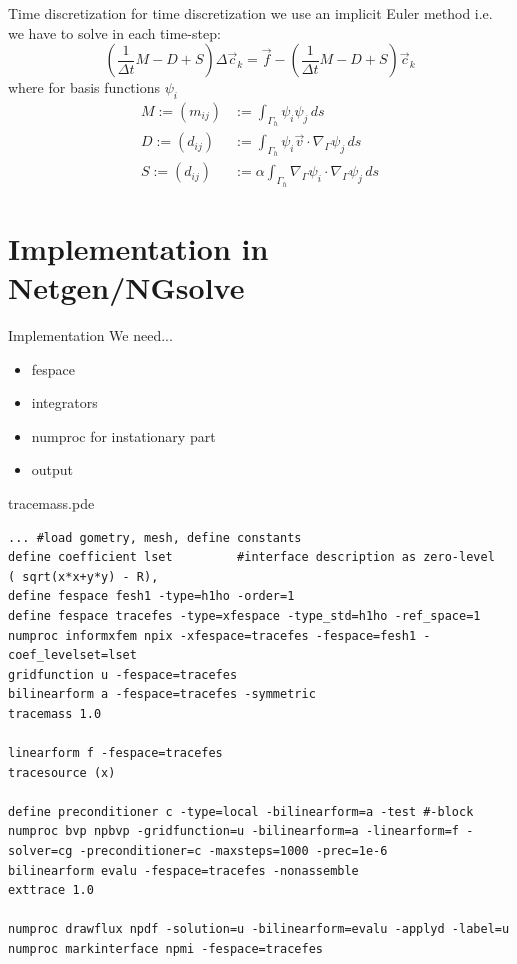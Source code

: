 \documentclass[11pt]{beamer}
\theoremstyle{plain}
\theoremstyle{definition}
\theoremstyle{remark}
\newcommand{\boundary}{\Gamma}
\begin{document}
\begin{frame}{Time discretization}
	for time discretization we use an implicit Euler method i.e. we have to solve in each time-step:
	\begin{equation}
		\left(\frac{1}{\Delta t}M-D+S\right)\Delta\vec c_{k}=\vec f-\left(\frac{1}{\Delta t}M-D+S\right)\vec c_k
	\end{equation}
	where for basis functions $\psi_i$
	\begin{align}
		M:=(m_{ij})&:=\int_{\boundary_h}\psi_i\psi_j\,ds\\
		D:=(d_{ij})&:=\int_{\boundary_h}\psi_i\vec v\cdot\nabla_\boundary\psi_j\,ds\\
		S:=(d_{ij})&:=\alpha\int_{\boundary_h}\nabla_\boundary\psi_i\cdot\nabla_\boundary\psi_j\,ds
	\end{align}
\end{frame}


\section{Implementation in Netgen/NGsolve}
\begin{frame}{Implementation}
	We need...
	\begin{itemize}[<+->]
		\item{fespace}
		\item{integrators}
		\item{numproc for instationary part}
		\item{output}	
	\end{itemize}
\end{frame}


\begin{frame}[fragile]{tracemass.pde}
	\begin{lstlisting}
... #load gometry, mesh, define constants
define coefficient lset 		#interface description as zero-level
( sqrt(x*x+y*y) - R),
define fespace fesh1 -type=h1ho -order=1
define fespace tracefes -type=xfespace -type_std=h1ho -ref_space=1
numproc informxfem npix -xfespace=tracefes -fespace=fesh1 -coef_levelset=lset
gridfunction u -fespace=tracefes
bilinearform a -fespace=tracefes -symmetric
tracemass 1.0

linearform f -fespace=tracefes
tracesource (x) 

define preconditioner c -type=local -bilinearform=a -test #-block
numproc bvp npbvp -gridfunction=u -bilinearform=a -linearform=f -solver=cg -preconditioner=c -maxsteps=1000 -prec=1e-6
bilinearform evalu -fespace=tracefes -nonassemble
exttrace 1.0

numproc drawflux npdf -solution=u -bilinearform=evalu -applyd -label=u
numproc markinterface npmi -fespace=tracefes
	\end{lstlisting}
\end{frame}
\end{document}
